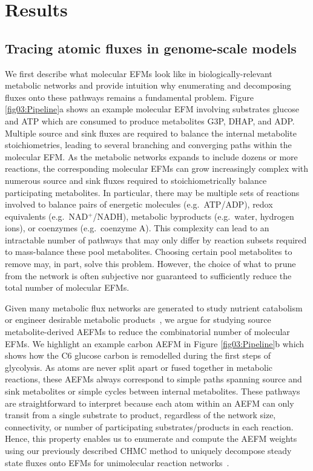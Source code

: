 \documentclass[12pt]{article}
\begin{document}
\fi

\section*{Results}

\subsection*{Tracing atomic fluxes in genome-scale models} %

We first describe what molecular EFMs look like in biologically-relevant
metabolic networks and provide intuition why enumerating and decomposing
fluxes onto these pathways remains a fundamental problem. Figure
\ref{fig03:Pipeline}a shows an example molecular EFM involving substrates
glucose and ATP which are consumed to produce metabolites G3P, DHAP, and
ADP. Multiple source and sink fluxes are required to balance the internal
metabolite stoichiometries, leading to several branching and converging
paths within the molecular EFM. As the metabolic networks expands to
include dozens or more reactions, the corresponding molecular EFMs can
grow increasingly complex with numerous source and sink fluxes required to
stoichiometrically balance participating metabolites. In particular, there
may be multiple sets of reactions involved to balance pairs of energetic
molecules (e.g.\ ATP/ADP), redox equivalents (e.g.\ NAD$^+$/NADH),
metabolic byproducts (e.g.\ water, hydrogen ions), or coenzymes (e.g.\
coenzyme A). This complexity can lead to an intractable number of pathways
that may only differ by reaction subsets required to mass-balance these
pool metabolites. Choosing certain pool metabolites to remove may, in
part, solve this problem. However, the choice of what to prune from the
network is often subjective nor guaranteed to sufficiently reduce the
total number of molecular EFMs.

Given many metabolic flux networks are generated to study nutrient
catabolism~\citep{ZamboniNicola2015DtMS} or engineer desirable metabolic
products~\citep{ZanghelliniJurgen2013Efmi}, we argue for studying source
metabolite-derived AEFMs to reduce the combinatorial number of molecular
EFMs. We highlight an example carbon AEFM in Figure \ref{fig03:Pipeline}b
which shows how the C6 glucose carbon is remodelled during the first steps
of glycolysis. As atoms are never split apart or fused together in
metabolic reactions, these AEFMs always correspond to simple paths
spanning source and sink metabolites or simple cycles between internal
metabolites. These pathways are straightforward to interpret because each
atom within an AEFM can only transit from a single substrate to product,
regardless of the network size, connectivity, or number of participating
substrates/products in each reaction. Hence, this property enables us to
enumerate and compute the AEFM weights using our previously described CHMC
method to uniquely decompose steady state fluxes onto EFMs for
unimolecular reaction networks~\citep{ChitpinJustinG2023AMct}.
\end{document}
